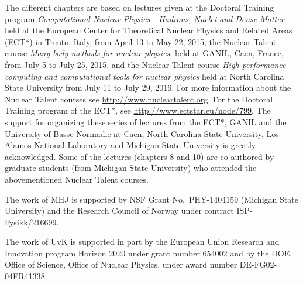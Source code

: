 \begin{acknowledgement}
The different chapters are based on lectures given at the Doctoral Training program {\em Computational Nuclear Physics - Hadrons, Nuclei and Dense Matter} held at  the European Center for Theoretical Nuclear Physics
and Related Areas (ECT*) in Trento, Italy, from April 13 to May 22, 2015, the Nuclear Talent course {\em Many-body methods for nuclear physics}, held at GANIL, Caen, France, from July 5 to July 25,  2015, and the Nuclear Talent course {\em High-performance computing and computational tools for nuclear physics} held at North Carolina State University from July 11 to July 29, 2016. For more information about the Nuclear Talent courses see \url{http://www.nucleartalent.org}. For the Doctoral Training program of the ECT*, see \url{http://www.ectstar.eu/node/799}.
The support for organizing these series of lectures from the ECT*, GANIL and the University of Basse Normadie at Caen, North Carolina State University, Los Alamos National Laboratory and Michigan State University is greatly acknowledged.   Some of the lectures (chapters 8 and 10) are co-authored by graduate students (from Michigan State University) who  attended the abovementioned Nuclear Talent courses.


The work of MHJ is supported by NSF Grant No.~PHY-1404159 (Michigan
State University) and the Research Council of Norway under contract
ISP-Fysikk/216699.

The work of UvK is supported in part by the European Union Research
and Innovation program Horizon 2020 under grant number 654002 and by
the DOE, Office of Science, Office of Nuclear Physics, under award
number DE-FG02-04ER41338.

\end{acknowledgement}

